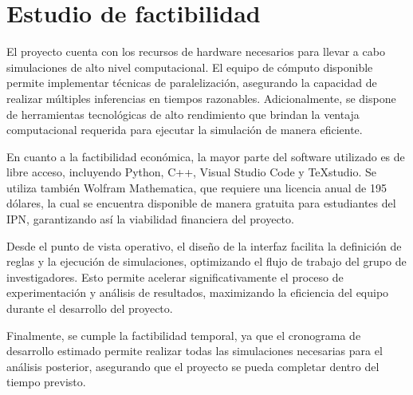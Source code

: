 \section{Estudio de factibilidad}

El proyecto cuenta con los recursos de hardware necesarios para llevar a cabo simulaciones de alto nivel computacional. El equipo de cómputo disponible permite implementar técnicas de paralelización, asegurando la capacidad de realizar múltiples inferencias en tiempos razonables. Adicionalmente, se dispone de herramientas tecnológicas de alto rendimiento que brindan la ventaja computacional requerida para ejecutar la simulación de manera eficiente.

En cuanto a la factibilidad económica, la mayor parte del software utilizado es de libre acceso, incluyendo Python, C++, Visual Studio Code y TeXstudio. Se utiliza también Wolfram Mathematica, que requiere una licencia anual de 195 dólares, la cual se encuentra disponible de manera gratuita para estudiantes del IPN, garantizando así la viabilidad financiera del proyecto.

Desde el punto de vista operativo, el diseño de la interfaz facilita la definición de reglas y la ejecución de simulaciones, optimizando el flujo de trabajo del grupo de investigadores. Esto permite acelerar significativamente el proceso de experimentación y análisis de resultados, maximizando la eficiencia del equipo durante el desarrollo del proyecto.

Finalmente, se cumple la factibilidad temporal, ya que el cronograma de desarrollo estimado permite realizar todas las simulaciones necesarias para el análisis posterior, asegurando que el proyecto se pueda completar dentro del tiempo previsto.
